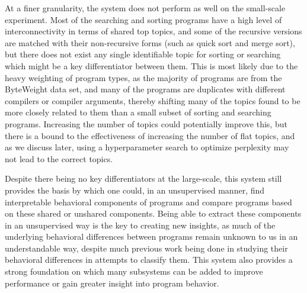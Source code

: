 At a finer granularity, the system does not perform as well on the small-scale experiment. Most of the searching and sorting programs have a high level of interconnectivity in terms of shared top topics, and some of the recursive versions are matched with their non-recursive forms (such as quick sort and merge sort), but there does not exist any single identifiable topic for sorting or searching which might be a key differentiator between them. This is most likely due to the heavy weighting of program types, as the majority of programs are from the ByteWeight data set, and many of the programs are duplicates with different compilers or compiler arguments, thereby shifting many of the topics found to be more closely related to them than a small subset of sorting and searching programs. Increasing the number of topics could potentially improve this, but there is a bound to the effectiveness of increasing the number of flat topics, and as we discuss later, using a hyperparameter search to optimize perplexity may not lead to the correct topics.

Despite there being no key differentiators at the large-scale, this system still provides the basis by which one could, in an unsupervised manner, find interpretable behavioral components of programs and compare programs based on these shared or unshared components. Being able to extract these components in an unsupervised way is the key to creating new insights, as much of the underlying behavioral differences between programs remain unknown to us in an understandable way, despite much previous work being done in studying their behavioral differences in attempts to classify them. This system also provides a strong foundation on which many subsystems can be added to improve performance or gain greater insight into program behavior.